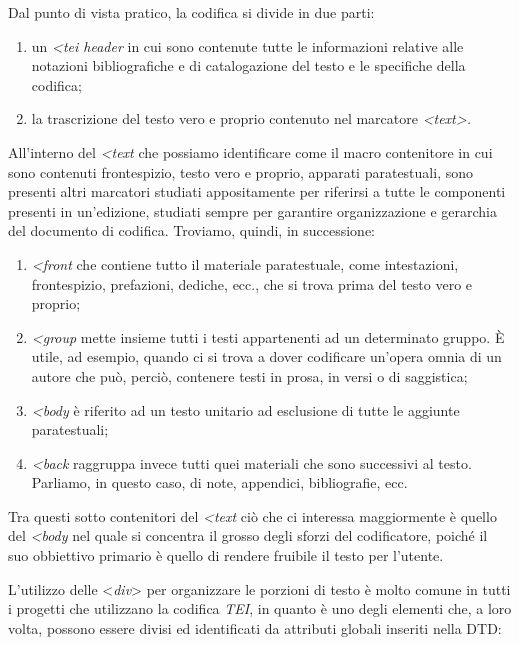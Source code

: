 {Dal punto di vista pratico, la codifica si divide in due parti:

\begin{enumerate}
\def\labelenumi{\arabic{enumi}.}
\item
  un \emph{\textless{}tei header} in cui sono contenute
  tutte le informazioni relative alle notazioni bibliografiche e di
  catalogazione del testo e le specifiche della codifica;
\item
  la trascrizione del testo vero e proprio contenuto nel marcatore
  \emph{\textless{}text\textgreater{}.}
\end{enumerate}

All'interno del \emph{\textless{}text} che possiamo
identificare come il macro contenitore in cui sono contenuti
frontespizio, testo vero e proprio, apparati paratestuali, sono presenti
altri marcatori studiati appositamente per riferirsi a tutte le
componenti presenti in un'edizione, studiati sempre per garantire
organizzazione e gerarchia del documento di codifica. Troviamo, quindi,
in successione:

\begin{enumerate}
\def\labelenumi{\arabic{enumi}.}
\item
  \emph{\textless{}front} che contiene tutto il materiale
  paratestuale, come intestazioni, frontespizio, prefazioni, dediche,
  ecc., che si trova prima del testo vero e proprio;
\item
  \emph{\textless{}group} mette insieme tutti i testi
  appartenenti ad un determinato gruppo. È utile, ad esempio, quando ci
  si trova a dover codificare un'opera omnia di un autore che può,
  perciò, contenere testi in prosa, in versi o di saggistica;
\item
  \emph{\textless{}body} è riferito ad un testo unitario
  ad esclusione di tutte le aggiunte paratestuali;
\item
  \emph{\textless{}back} raggruppa invece tutti quei
  materiali che sono successivi al testo. Parliamo, in questo caso, di
  note, appendici, bibliografie, ecc.
\end{enumerate}

Tra questi sotto contenitori del \emph{\textless{}text}
ciò che ci interessa maggiormente è quello del
\emph{\textless{}body} nel quale si concentra il grosso
degli sforzi del codificatore, poiché il suo obbiettivo primario è
quello di rendere fruibile il testo per l'utente.

L'utilizzo delle \textless{}\emph{div}\textgreater{} per organizzare le
porzioni di testo è molto comune in tutti i progetti che utilizzano la
codifica \emph{TEI}, in quanto è uno degli elementi che, a loro volta,
possono essere divisi ed identificati da attributi globali inseriti
nella DTD:

}
